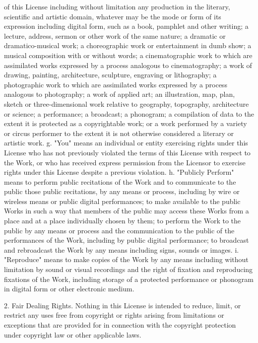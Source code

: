     of this License including without limitation any production in the
    literary, scientific and artistic domain, whatever may be the mode or
    form of its expression including digital form, such as a book,
    pamphlet and other writing; a lecture, address, sermon or other work
    of the same nature; a dramatic or dramatico-musical work; a
    choreographic work or entertainment in dumb show; a musical
    composition with or without words; a cinematographic work to which are
    assimilated works expressed by a process analogous to cinematography;
    a work of drawing, painting, architecture, sculpture, engraving or
    lithography; a photographic work to which are assimilated works
    expressed by a process analogous to photography; a work of applied
    art; an illustration, map, plan, sketch or three-dimensional work
    relative to geography, topography, architecture or science; a
    performance; a broadcast; a phonogram; a compilation of data to the
    extent it is protected as a copyrightable work; or a work performed by
    a variety or circus performer to the extent it is not otherwise
    considered a literary or artistic work.
 g. "You" means an individual or entity exercising rights under this
    License who has not previously violated the terms of this License with
    respect to the Work, or who has received express permission from the
    Licensor to exercise rights under this License despite a previous
    violation.
 h. "Publicly Perform" means to perform public recitations of the Work and
    to communicate to the public those public recitations, by any means or
    process, including by wire or wireless means or public digital
    performances; to make available to the public Works in such a way that
    members of the public may access these Works from a place and at a
    place individually chosen by them; to perform the Work to the public
    by any means or process and the communication to the public of the
    performances of the Work, including by public digital performance; to
    broadcast and rebroadcast the Work by any means including signs,
    sounds or images.
 i. "Reproduce" means to make copies of the Work by any means including
    without limitation by sound or visual recordings and the right of
    fixation and reproducing fixations of the Work, including storage of a
    protected performance or phonogram in digital form or other electronic
    medium.

2. Fair Dealing Rights. Nothing in this License is intended to reduce,
limit, or restrict any uses free from copyright or rights arising from
limitations or exceptions that are provided for in connection with the
copyright protection under copyright law or other applicable laws.

